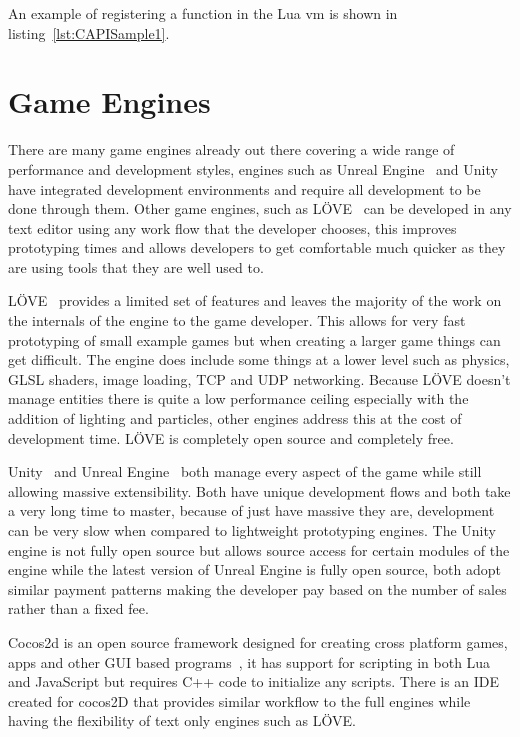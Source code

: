 \documentclass[11pt,a4paper,titlepage]{article}
\begin{document}
			An example of registering a function in the Lua vm is shown in listing~\ref{lst:CAPISample1}.
			

	\newpage

	\section{Game Engines}
		
		There are many game engines already out there covering a wide range of performance and development styles, engines such as Unreal Engine~\cite{UE} and Unity~\cite{Unity} have integrated development environments and require all development to be done through them. Other game engines, such as LÖVE~\cite{LOVE} can be developed in any text editor using any work flow that the developer chooses, this improves prototyping times and allows developers to get comfortable much quicker as they are using tools that they are well used to.

		LÖVE~\cite{LOVE} provides a limited set of features and leaves the majority of the work on the internals of the engine to the game developer. This allows for very fast prototyping of small example games but when creating a larger game things can get difficult. The engine does include some things at a lower level such as physics, GLSL shaders, image loading, TCP and UDP networking. Because LÖVE doesn't manage entities there is quite a low performance ceiling especially with the addition of lighting and particles, other engines address this at the cost of development time. LÖVE is completely open source and completely free.

		Unity~\cite{Unity} and Unreal Engine~\cite{UE} both manage every aspect of the game while still allowing massive extensibility. Both have unique development flows and both take a very long time to master, because of just have massive they are, development can be very slow when compared to lightweight prototyping engines. The Unity engine is not fully open source but allows source access for certain modules of the engine while the latest version of Unreal Engine is fully open source, both adopt similar payment patterns making the developer pay based on the number of sales rather than a fixed fee.
		
		Cocos2d is an open source framework designed for creating cross platform games, apps and other GUI based programs~\cite{COCOS2D}, it has support for scripting in both Lua and JavaScript but requires C++ code to initialize any scripts. There is an IDE created for cocos2D that provides similar workflow to the full engines while having the flexibility of text only engines such as LÖVE.
\end{document}
